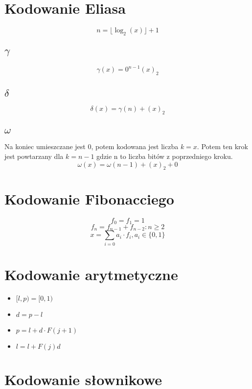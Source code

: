 \documentclass{../notatki}
\begin{document}
\begin{multicols}{2}
  \section{Kodowanie Eliasa}

  $$
  n = \lfloor \log_2(x) \rfloor + 1
  $$

  \subsection{\texorpdfstring{$\gamma$}{Gamma}}

  $$
  \gamma(x) = 0^{n-1}(x)_2
  $$

  \subsection{\texorpdfstring{$\delta$}{Delta}}

  $$
  \delta(x) = \gamma(n) + (x)_2
  $$

  \subsection{\texorpdfstring{$\omega$}{Omega}}

  Na koniec umieszczane jest $0$, potem kodowana jest liczba $k=x$. Potem ten
  krok jest powtarzany dla $k=n - 1$ gdzie n to liczba bitów z
  poprzedniego kroku.
  $$
  \omega(x) = \omega(n - 1) + (x)_2 + 0
  $$

  \section{Kodowanie Fibonacciego}

  $$
  f_0=f_1=1
  $$
  $$
  f_n = f_{n-1} + f_{n-2}: n \geq 2
  $$
  $$
  x = \sum_{i=0} a_i \cdot f_i, a_i \in \{0,1\}
  $$

  \section{Kodowanie arytmetyczne}

  \begin{itemize}
    \item $[l, p)=[0, 1)$
    \item $d = p - l$
    \item $p = l + d \cdot F(j + 1)$
    \item $l = l + F(j)d$
  \end{itemize}

  \section{Kodowanie słownikowe}


\end{multicols}
\end{document}
